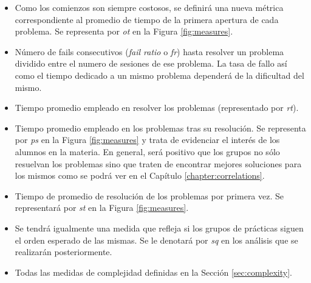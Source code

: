 \begin{itemize}
\item Como los comienzos son siempre costosos, se definirá una nueva métrica correspondiente al promedio de tiempo de la primera apertura de cada problema. Se representa por \emph{ot} en la Figura \ref{fig:measures}.
\item Número de fails consecutivos (\emph{fail ratio} o \emph{fr}) hasta resolver un problema dividido entre el numero de sesiones de ese problema. La tasa de fallo así como el tiempo dedicado a un mismo problema dependerá de la dificultad del mismo.
\item Tiempo promedio empleado en resolver los problemas (representado por \emph{rt}).
\item Tiempo promedio empleado en los problemas tras su resolución. Se representa por \emph{ps} en la Figura \ref{fig:measures} y trata de evidenciar el interés de los alumnos en la materia. En general, será positivo que los grupos no sólo resuelvan los problemas sino que traten de encontrar mejores soluciones para los mismos como se podrá ver en el Capítulo \ref{chapter:correlations}.
\item Tiempo de promedio de resolución de los problemas por primera vez. Se representará por \emph{st} en la Figura \ref{fig:measures}.
\item Se tendrá igualmente una medida que refleja si los grupos de prácticas siguen el orden esperado de las mismas. Se le denotará por \emph{sq} en los análisis que se realizarán posteriormente.
\item Todas las medidas de complejidad definidas en la Sección \ref{sec:complexity}.
\end{itemize}